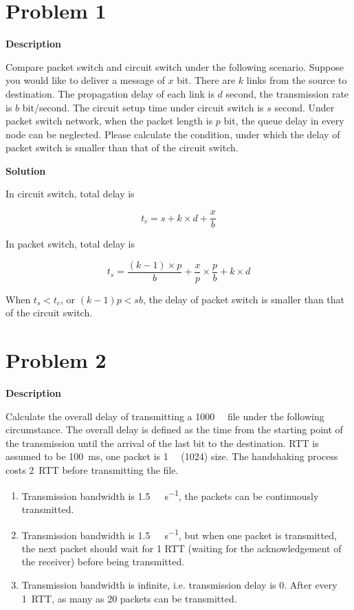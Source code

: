 \documentclass[12pt,letterpaper]{ctexart}
\begin{document}
\section*{Problem 1}

{\bf Description}

Compare packet switch and circuit switch under the following scenario.
Suppose you would like to deliver a message of $x$ bit.
There are $k$ links from the source to destination.
The propagation delay of each link is $d$ second, the transmission rate is $b$ bit/second.
The circuit setup time under circuit switch is $s$ second.
Under packet switch network, when the packet length is $p$ bit, the queue delay in every node can be neglected.
Please calculate the condition, under which the delay of packet switch is smaller than that of the circuit switch.

{\bf Solution}

  In circuit switch, total delay is

  $$
  t_{c} = s + k \times d + \frac{x}{b}
  $$

  In packet switch, total delay is

  $$
  t_{s} = \frac{(k - 1) \times p }{b} + \frac{x}{p} \times \frac{p}{b} + k \times  d
  $$

  When $t_s < t_c$, or $ (k - 1) p < sb$, the delay of packet switch is smaller than that of the circuit switch.

\newpage

\section*{Problem 2}

{\bf Description}

Calculate the overall delay of transmitting a \SI{1000}{\kilo\byte} file under the following circumstance.
The overall delay is defined as the time from the starting point of the transmission until the arrival of the last bit to the destination.
RTT is assumed to be \SI{100}{\ms}, one packet is \SI{1}{\kilo\byte} (\SI{1024}{\byte}) size.
The handshaking process costs \SI{2}{RTT} before transmitting the file.
\begin{enumerate}
  \item Transmission bandwidth is \SI[per-mode=symbol]{1.5}{\mega\bit\per\second}, the packets can be continuously transmitted.
  \item Transmission bandwidth is \SI[per-mode=symbol]{1.5}{\mega\bit\per\second}, but when one packet is transmitted, the next packet should wait for 1 RTT (waiting for the acknowledgement of the receiver) before being transmitted.
  \item Transmission bandwidth is infinite, i.e. transmission delay is 0. After every \SI{1}{RTT}, as many as 20 packets can be transmitted.
\end{enumerate}
\end{document}
